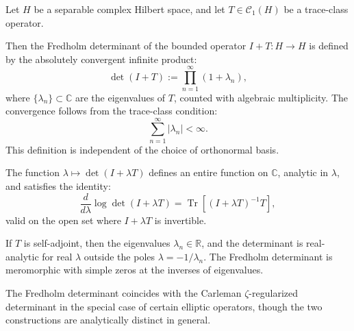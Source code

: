 \begin{definition}
\label{def:fredholm-determinant}
Let \( H \) be a separable complex Hilbert space, and let \( T \in \mathcal{C}_1(H) \) be a trace-class operator.

Then the Fredholm determinant of the bounded operator \( I + T \colon H \to H \) is defined by the absolutely convergent infinite product:
\[
\det(I + T) := \prod_{n=1}^\infty (1 + \lambda_n),
\]
where \( \{ \lambda_n \} \subset \mathbb{C} \) are the eigenvalues of \( T \), counted with algebraic multiplicity. The convergence follows from the trace-class condition:
\[
\sum_{n=1}^\infty |\lambda_n| < \infty.
\]
This definition is independent of the choice of orthonormal basis.

\medskip

The function \( \lambda \mapsto \det(I + \lambda T) \) defines an entire function on \( \mathbb{C} \), analytic in \( \lambda \), and satisfies the identity:
\[
\frac{d}{d\lambda} \log \det(I + \lambda T)
= \operatorname{Tr}\left[ (I + \lambda T)^{-1} T \right],
\]
valid on the open set where \( I + \lambda T \) is invertible.

\medskip

If \( T \) is self-adjoint, then the eigenvalues \( \lambda_n \in \mathbb{R} \), and the determinant is real-analytic for real \( \lambda \) outside the poles \( \lambda = -1/\lambda_n \). The Fredholm determinant is meromorphic with simple zeros at the inverses of eigenvalues.

\medskip

The Fredholm determinant coincides with the Carleman \(\zeta\)-regularized determinant in the special case of certain elliptic operators, though the two constructions are analytically distinct in general.
\end{definition}
% 